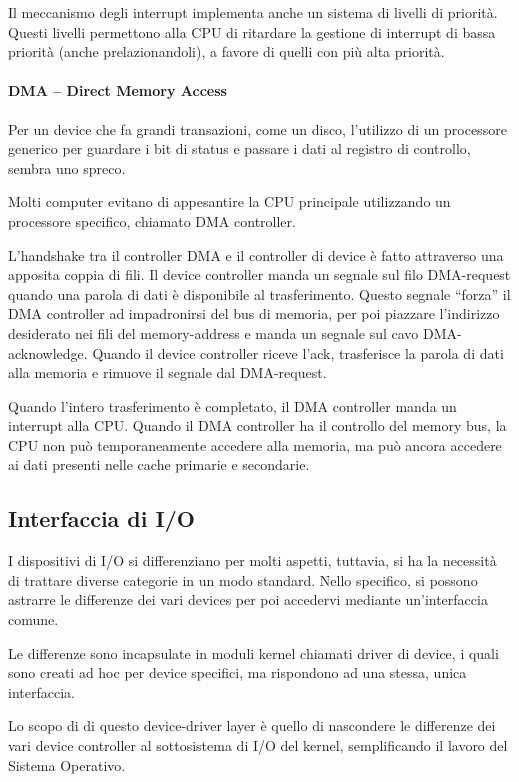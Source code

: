 \documentclass[a4paper]{article}
\begin{document}
Il meccanismo degli interrupt implementa anche un sistema di livelli di priorità. Questi livelli permettono alla CPU di ritardare la gestione di interrupt di bassa priorità (anche prelazionandoli), a favore di quelli con più alta priorità.

\paragraph{DMA -- Direct Memory Access}

Per un device che fa grandi transazioni, come un disco, l'utilizzo di un processore generico per guardare i bit di status e passare i dati al registro di controllo, sembra uno spreco.

Molti computer evitano di appesantire la CPU principale utilizzando un processore specifico, chiamato DMA controller.

L'handshake tra il controller DMA e il controller di device è fatto attraverso una apposita coppia di fili. Il device controller manda un segnale sul filo DMA-request quando una parola di dati è disponibile al trasferimento. Questo segnale ``forza'' il DMA controller ad impadronirsi del bus di memoria, per poi piazzare l'indirizzo desiderato nei fili del memory-address e manda un segnale sul cavo DMA-acknowledge. Quando il device controller riceve l'ack, trasferisce la parola di dati alla memoria e rimuove il segnale dal DMA-request.

Quando l'intero trasferimento è completato, il DMA controller manda un interrupt alla CPU. Quando il DMA controller ha il controllo del memory bus, la CPU non può temporaneamente accedere alla memoria, ma può ancora accedere ai dati presenti nelle cache primarie e secondarie.

\subsection{Interfaccia di I/O}

I dispositivi di I/O si differenziano per molti aspetti, tuttavia, si ha la necessità di trattare diverse categorie in un modo standard. Nello specifico, si possono astrarre le differenze dei vari devices per poi accedervi mediante un'interfaccia comune.

Le differenze sono incapsulate in moduli kernel chiamati driver di device, i quali sono creati ad hoc per device specifici, ma rispondono ad una stessa, unica interfaccia.

Lo scopo di di questo device-driver layer è quello di nascondere le differenze dei vari device controller al sottosistema di I/O del kernel, semplificando il lavoro del Sistema Operativo.
\end{document}

